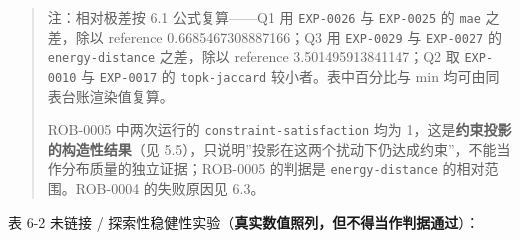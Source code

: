 \documentclass[
  11pt,
]{ctexart}
\begin{document}
\begin{quote}
注：相对极差按 6.1 公式复算------Q1 用 \texttt{EXP-0026} 与
\texttt{EXP-0025} 的 \texttt{mae} 之差，除以 reference
0.6685467308887166；Q3 用 \texttt{EXP-0029} 与 \texttt{EXP-0027} 的
\texttt{energy-distance} 之差，除以 reference 3.501495913841147；Q2 取
\texttt{EXP-0010} 与 \texttt{EXP-0017} 的 \texttt{topk-jaccard}
较小者。表中百分比与 min 均可由同表台账渲染值复算。

ROB-0005 中两次运行的 \texttt{constraint-satisfaction} 均为
1，这是\textbf{约束投影的构造性结果}（见
5.5），只说明''投影在这两个扰动下仍达成约束''，不能当作分布质量的独立证据；ROB-0005
的判据是 \texttt{energy-distance} 的相对范围。ROB-0004 的失败原因见
6.3。
\end{quote}

表 6-2 未链接 /
探索性稳健性实验（\textbf{真实数值照列，但不得当作判据通过}）：
\end{document}
